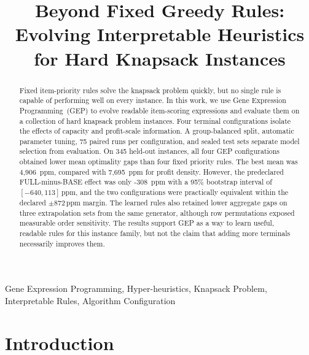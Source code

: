 \documentclass[conference]{IEEEtran}
\newcommand{\ppm}{\,\mathrm{ppm}}
\begin{document}
\title{Beyond Fixed Greedy Rules: Evolving Interpretable Heuristics for Hard Knapsack Instances}

\author{
}

\maketitle

\begin{abstract}
    Fixed item-priority rules solve the knapsack problem quickly, but no single rule is capable of performing well on every instance. In this work, we use Gene Expression Programming~(GEP) to evolve readable item-scoring expressions and evaluate them on a collection of hard knapsack problem instances. Four terminal configurations isolate the effects of capacity and profit-scale information. A group-balanced split, automatic parameter tuning, 75 paired runs per configuration, and sealed test sets separate model selection from evaluation. On 345 held-out instances, all four GEP configurations obtained lower mean optimality gaps than four fixed priority rules. The best mean was 4,906 $\ppm$, compared with 7,695 $\ppm$ for profit density. However, the predeclared FULL-minus-BASE effect was only -308 $\ppm$ with a 95\% bootstrap interval of $[-640,113] \ppm$, and the two configurations were practically equivalent within the declared $\pm872\ppm$ margin. The learned rules also retained lower aggregate gaps on three extrapolation sets from the same generator, although row permutations exposed measurable order sensitivity. The results support GEP as a way to learn useful, readable rules for this instance family, but not the claim that adding more terminals necessarily improves them.
\end{abstract}

\begin{IEEEkeywords}
    Gene Expression Programming, Hyper-heuristics, Knapsack Problem, Interpretable Rules, Algorithm Configuration
\end{IEEEkeywords}

\section{Introduction}
\label{sec:Introduction}
\end{document}
